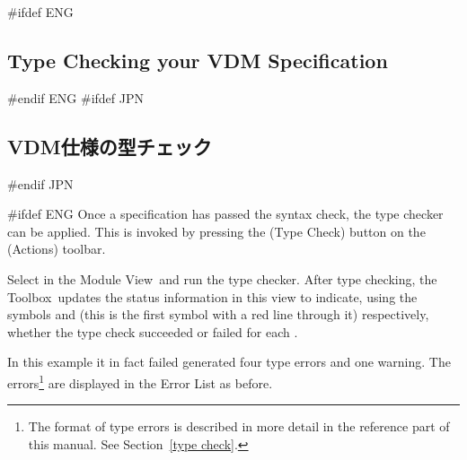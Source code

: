 \documentclass[\pformat,12pt]{article}
\newcommand{\Toolbox}{Toolbox}
\newcommand{\vdmModView}{\guicmd{Module View}}
\newcommand{\vdmModView}{\guicmd{モジュールビュー}}
\newcommand{\Toolbox}{Toolbox}
\newcommand{\vdmModView}{\guicmd{VDM View}}
\newcommand{\vdmModView}{\guicmd{VDMビュー}}
\newcommand{\guicmd}[1]{{\sf #1}}
\newcommand{\guicmd}[1]{{\gt #1}}
\begin{document}
#ifdef ENG
\subsection{Type Checking your VDM Specification}
\label{sec:gde-tc}
#endif ENG
#ifdef JPN
\subsection{VDM仕様の型チェック}
\label{sec:gde-tc}
#endif JPN

#ifdef ENG
Once a specification has passed the syntax check, the type checker
can be applied. This is invoked by pressing the 
(\guicmd{Type Check}) button on the (\guicmd{Actions}) toolbar.

Select  in the \vdmModView\ and run the type 
checker. After type checking, the \Toolbox\ updates the status 
  information in this view to indicate,
using the symbols 
and
(this is the first symbol
with a red line through it) 
respectively, whether the type check succeeded or failed for each
.

In this example it in fact failed 
generated four type errors and one warning. The errors\footnote{The
  format of type errors is described in more detail in the reference
  part of this manual. See Section~\ref{type check}.} are displayed in
the \guicmd{Error List} as before.
\end{document}
